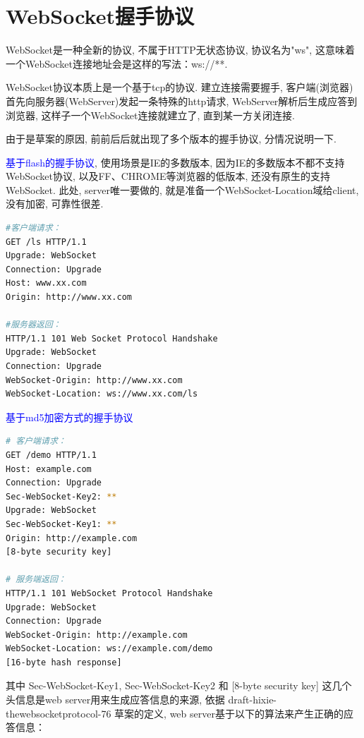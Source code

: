 \section {\ZHH WebSocket握手协议} {
    {WebSocket是一种全新的协议, 不属于HTTP无状态协议, 协议名为"ws", 这意味着一个WebSocket连接地址会是这样的写法：ws://**.}\par

    {WebSocket协议本质上是一个基于tcp的协议. 建立连接需要握手, 客户端(浏览器)首先向服务器(WebServer)发起一条特殊的http请求, WebServer解析后生成应答到浏览器, 这样子一个WebSocket连接就建立了, 直到某一方关闭连接.}\par

    {由于是草案的原因, 前前后后就出现了多个版本的握手协议, 分情况说明一下.}\par

    {\textcolor{blue}{基于flash的握手协议},  使用场景是IE的多数版本, 因为IE的多数版本不都不支持WebSocket协议, 以及FF、CHROME等浏览器的低版本, 还没有原生的支持WebSocket. 此处, server唯一要做的, 就是准备一个WebSocket-Location域给client, 没有加密, 可靠性很差.}\par

\begin{lstlisting}[language=bash]
#客户端请求：
GET /ls HTTP/1.1
Upgrade: WebSocket
Connection: Upgrade
Host: www.xx.com
Origin: http://www.xx.com

#服务器返回：
HTTP/1.1 101 Web Socket Protocol Handshake
Upgrade: WebSocket
Connection: Upgrade
WebSocket-Origin: http://www.xx.com
WebSocket-Location: ws://www.xx.com/ls
\end{lstlisting}

    {\textcolor{blue}{基于md5加密方式的握手协议}}\par

\begin{lstlisting}[language=bash]
# 客户端请求：
GET /demo HTTP/1.1
Host: example.com
Connection: Upgrade
Sec-WebSocket-Key2: **
Upgrade: WebSocket
Sec-WebSocket-Key1: **
Origin: http://example.com
[8-byte security key]

# 服务端返回：
HTTP/1.1 101 WebSocket Protocol Handshake
Upgrade: WebSocket
Connection: Upgrade
WebSocket-Origin: http://example.com
WebSocket-Location: ws://example.com/demo
[16-byte hash response]
\end{lstlisting}

    {其中 Sec-WebSocket-Key1, Sec-WebSocket-Key2 和 [8-byte security key] 这几个头信息是web server用来生成应答信息的来源, 依据 draft-hixie-thewebsocketprotocol-76 草案的定义, web server基于以下的算法来产生正确的应答信息：}\par

}
